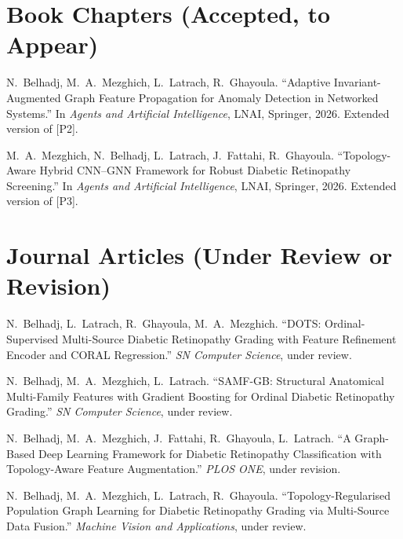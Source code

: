 \section*{Book Chapters (Accepted, to Appear)}

\begin{description}[style=sameline,leftmargin=3.2em,labelwidth=2.6em,itemsep=1pt]
\item[{[B1]}] N.~Belhadj, M.~A.~Mezghich, L.~Latrach, R.~Ghayoula. ``Adaptive
Invariant-Augmented Graph Feature Propagation for Anomaly Detection in Networked Systems.''
In \emph{Agents and Artificial Intelligence}, LNAI, Springer, 2026. Extended version of [P2].
\item[{[B2]}] M.~A.~Mezghich, N.~Belhadj, L.~Latrach, J.~Fattahi, R.~Ghayoula.
``Topology-Aware Hybrid CNN--GNN Framework for Robust Diabetic Retinopathy Screening.'' In
\emph{Agents and Artificial Intelligence}, LNAI, Springer, 2026. Extended version of [P3].
\end{description}

\section*{Journal Articles (Under Review or Revision)}

\begin{description}[style=sameline,leftmargin=3.2em,labelwidth=2.6em,itemsep=1pt]
\item[{[J1]}] N.~Belhadj, L.~Latrach, R.~Ghayoula, M.~A.~Mezghich. ``DOTS:
Ordinal-Supervised Multi-Source Diabetic Retinopathy Grading with Feature Refinement
Encoder and CORAL Regression.'' \emph{SN Computer Science}, under review.
\item[{[J2]}] N.~Belhadj, M.~A.~Mezghich, L.~Latrach. ``SAMF-GB: Structural Anatomical
Multi-Family Features with Gradient Boosting for Ordinal Diabetic Retinopathy Grading.''
\emph{SN Computer Science}, under review.
\item[{[J3]}] N.~Belhadj, M.~A.~Mezghich, J.~Fattahi, R.~Ghayoula, L.~Latrach. ``A
Graph-Based Deep Learning Framework for Diabetic Retinopathy Classification with
Topology-Aware Feature Augmentation.'' \emph{PLOS ONE}, under revision.
\item[{[J4]}] N.~Belhadj, M.~A.~Mezghich, L.~Latrach, R.~Ghayoula. ``Topology-Regularised
Population Graph Learning for Diabetic Retinopathy Grading via Multi-Source Data
Fusion.'' \emph{Machine Vision and Applications}, under review.
\end{description}

